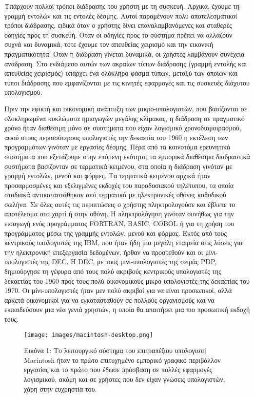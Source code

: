 \documentclass[
]{article}
\begin{document}
Υπάρχουν πολλοί τρόποι διάδρασης του χρήστη με τη συσκευή. Αρχικά,
έχουμε τη γραμμή εντολών και τις εντολές δέσμης. Αυτοί παραμένουν πολύ
αποτελεσματικοί τρόποι διάδρασης, ειδικά όταν ο χρήστης δίνει
επαναλαμβανόμενες και σταθερές οδηγίες προς τη συσκευή. Όταν οι οδηγίες
προς το σύστημα πρέπει να αλλάζουν συχνά και δυναμικά, τότε έχουμε τον
απευθείας χειρισμό και την εικονική πραγματικότητα. Όταν η διάδραση
γίνεται δυναμικά, οι χρήστες λαμβάνουν συνέχεια ανάδραση. Στο ενδιάμεσο
αυτών των ακραίων τύπων διάδρασης (γραμμή εντολής και απευθείας
χειρισμός) υπάρχει ένα ολόκληρο φάσμα τύπων, μεταξύ των οποίων και τύποι
διάδρασης που εμφανίζονται με τις κινητές εφαρμογές και τις συσκευές
διάχυτου υπολογισμού.

Πριν την εφικτή και οικονομική ανάπτυξη των μικρο-υπολογιστών, που
βασίζονται σε ολοκληρωμένα κυκλώματα ημιαγωγών μεγάλης κλίμακας, η
διάδραση σε πραγματικό χρόνο ήταν διαθέσιμη μόνο σε συστήματα που είχαν
λογισμικό χρονοδιαμοιρασμού, αφού στους περισσότερους υπολογιστές την
δεκαετία του 1960 η εκτέλεση των προγραμμάτων γινόταν με εργασίες
δέσμης. Πέρα από τα καινοτόμα ερευνητικά συστήματα που εξετάζουμε στην
επόμενη ενότητα, τα εμπορικά διαθέσιμα διαδραστικά συστήματα βασίζονταν
σε τερματικά κειμένου, στα οποία η διάδραση γινόταν με γραμμή εντολών,
μενού και φόρμες. Τα τερματικά κειμένου αρχικά ήταν προσαρμοσμένες και
εξελιγμένες εκδοχές του παραδοσιακού τηλέτυπου, τα οποία σταδιακά
αντικαταστάθηκαν από τερματικά με ηλεκτρονικές οθόνες καθοδικού σωλήνα.
Σε όλες αυτές τις περιπτώσεις ο χρήστης πληκτρολογούσε και έβλεπε το
αποτέλεσμα στο χαρτί ή στην οθόνη. Η πληκτρολόγηση γινόταν συνήθως για
την εισαγωγή ενός προγράμματος FORTRAN, BASIC, COBOL ή για τη χρήση του
προγράμματος μέσω της γραμμής εντολών, μενού και φόρμας. Εκτός από τους
κεντρικούς υπολογιστές της IBM, που ήταν ήδη μια μεγάλη εταιρεία στις
λύσεις για την ηλεκτρονική επεξεργασία δεδομένων, ήρθαν να προστεθούν
και οι μίνι-υπολογιστές της DEC. Η DEC, με τους μινι-υπολογιστές της
σειράς PDP, δημιούργησε τη γέφυρα από τους πολύ ακριβούς κεντρικούς
υπολογιστές της δεκαετίας του 1960 προς τους πολύ οικονομικούς
μικρο-υπολογιστές της δεκαετίας του 1970. Οι μίνι-υπολογιστές ήταν μεν
πολύ ακριβοί για να είναι προσωπικοί, αλλά αρκετά οικονομικοί για να
εγκατασταθούν σε πολλούς οργανισμούς και να εκπαιδεύσουν μια νέα γενιά
χρηστών, η οποία θα απαιτήσει μια πιο προσωπική εκδοχή τους.

\leavevmode{}%
\begin{figure}
\hypertarget{fig:macintosh-desktop}{%
\centering
\texttt{[image: images/macintosh-desktop.png]}
\caption{Εικόνα 1: Το λειτουργικό σύστημα του επιτραπέζιου υπολογιστή
Macintosh ήταν το πρώτο επιτυχημένο εμπορικό γραφικό περιβάλλον εργασίας
και το πρώτο που έδωσε πρόσβαση σε πολλές εφαρμογές λογισμικού, ακόμη
και σε χρήστες που δεν είχαν γνώσεις υπολογιστών, χάρη στην ευχρηστία
του.}\label{fig:macintosh-desktop}
}
\end{figure}
\end{document}
